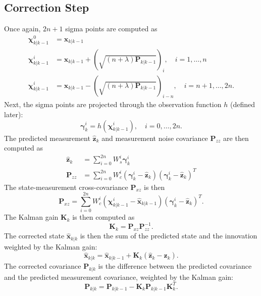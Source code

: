 \subsection{Correction Step}

Once again, $2n + 1$ sigma points are computed as
%
\begin{align}
\mathbf{\chi}^{0}_{k | k-1} &= \mathbf{x}_{k | k-1} \nonumber\\
\mathbf{\chi}^{i}_{k | k-1} &= \mathbf{x}_{k | k-1} + \left( \sqrt{\left( n + \lambda \right) \mathbf{P}_{k | k-1}} \right)_{i}, \quad i = 1, \dots, n \\
\mathbf{\chi}^{i}_{k | k-1} &= \mathbf{x}_{k | k-1} - \left( \sqrt{\left( n + \lambda \right) \mathbf{P}_{k | k-1}} \right)_{i-n}, \quad i = n+1, \dots, 2n. \nonumber
\end{align}
%
Next, the sigma points are projected through the observation function $h$ (defined later):
%
\begin{equation}
\mathbf{\gamma}^{i}_{k} = h \left( \mathbf{\chi}^{i}_{k | k-1} \right), \quad i = 0, \dots, 2n.
\end{equation}
%
The predicted measurement $\hat{\mathbf{z}}_{k}$ and measurement noise covariance $\mathbf{P}_{zz}$ are then computed as
%
\begin{align}
\hat{\mathbf{z}}_{k} &= \sum^{2n}_{i=0} W^{i}_{s} \mathbf{\gamma}^{i}_{k} \\
\mathbf{P}_{zz} &= \sum^{2n}_{i=0} W^{i}_{c} \left( \mathbf{\gamma}^{i}_{k} - \hat{\mathbf{z}}_{k} \right) \left( \mathbf{\gamma}^{i}_{k} - \hat{\mathbf{z}}_{k} \right)^{T} 
\end{align}
%
The state-measurement cross-covariance $\mathbf{P}_{xz}$ is then
%
\begin{equation}
\mathbf{P}_{xz} = \sum^{2n}_{i=0} W^{i}_{c} \left( \mathbf{\chi}^{i}_{k | k-1} - \hat{\mathbf{x}}_{k | k-1} \right) \left( \mathbf{\gamma}^{i}_{k} - \hat{\mathbf{z}}_{k} \right)^{T} .
\end{equation}
%
The Kalman gain $\mathbf{K}_{k}$ is then computed as
%
\begin{equation}
\mathbf{K}_{k} = \mathbf{P}_{xz} \mathbf{P}^{-1}_{zz}.
\end{equation}
%
The corrected state $\hat{\mathbf{x}}_{k | k}$ is then the sum of the predicted state and the innovation weighted by the Kalman gain:
%
\begin{equation}
\hat{\mathbf{x}}_{k | k} = \hat{\mathbf{x}}_{k | k-1} + \mathbf{K}_{k} \left( \hat{\mathbf{z}}_{k} - \mathbf{z}_{k} \right) .
\end{equation}
%
The corrected covariance $\mathbf{P}_{k | k}$ is the difference between the predicted covariance and the predicted measurement covariance, weighted by the Kalman gain:
%
\begin{equation}
\mathbf{P}_{k | k} = \mathbf{P}_{k | k-1} - \mathbf{K}_{k} \mathbf{P}_{k | k-1} \mathbf{K}_{k}^{T} .
\end{equation}


